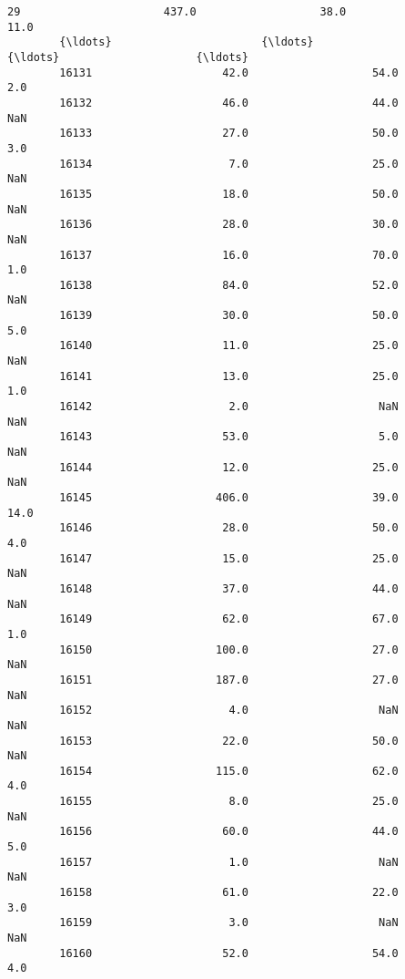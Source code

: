 \documentclass[11pt]{article}
\begin{document}
\begin{Verbatim}[commandchars=\\\{\}]
        29                      437.0                   38.0                    11.0   
        {\ldots}                       {\ldots}                    {\ldots}                     {\ldots}   
        16131                    42.0                   54.0                     2.0   
        16132                    46.0                   44.0                     NaN   
        16133                    27.0                   50.0                     3.0   
        16134                     7.0                   25.0                     NaN   
        16135                    18.0                   50.0                     NaN   
        16136                    28.0                   30.0                     NaN   
        16137                    16.0                   70.0                     1.0   
        16138                    84.0                   52.0                     NaN   
        16139                    30.0                   50.0                     5.0   
        16140                    11.0                   25.0                     NaN   
        16141                    13.0                   25.0                     1.0   
        16142                     2.0                    NaN                     NaN   
        16143                    53.0                    5.0                     NaN   
        16144                    12.0                   25.0                     NaN   
        16145                   406.0                   39.0                    14.0   
        16146                    28.0                   50.0                     4.0   
        16147                    15.0                   25.0                     NaN   
        16148                    37.0                   44.0                     NaN   
        16149                    62.0                   67.0                     1.0   
        16150                   100.0                   27.0                     NaN   
        16151                   187.0                   27.0                     NaN   
        16152                     4.0                    NaN                     NaN   
        16153                    22.0                   50.0                     NaN   
        16154                   115.0                   62.0                     4.0   
        16155                     8.0                   25.0                     NaN   
        16156                    60.0                   44.0                     5.0   
        16157                     1.0                    NaN                     NaN   
        16158                    61.0                   22.0                     3.0   
        16159                     3.0                    NaN                     NaN   
        16160                    52.0                   54.0                     4.0   
        

\end{Verbatim}
\end{document}
